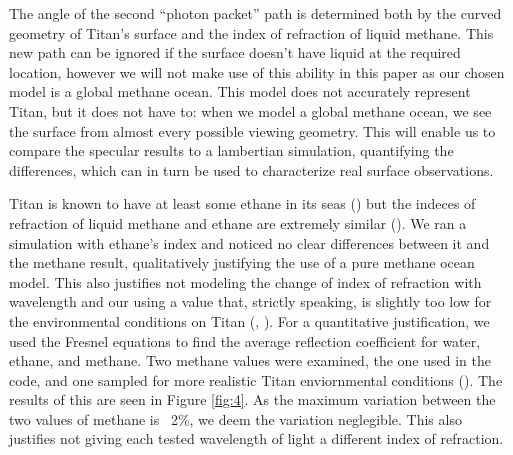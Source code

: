 \documentclass{article}
\begin{document}
The angle of the second ``photon packet'' path is determined both by the curved geometry of Titan's surface and the index of refraction of liquid methane. This new path can be ignored if the surface doesn't have liquid at the required location, however we will not make use of this ability in this paper as our chosen model is a global methane ocean. This model does not accurately represent Titan, but it does not have to: when we model a global methane ocean, we see the surface from almost every possible viewing geometry. This will enable us to compare the specular results to a lambertian simulation, quantifying the differences, which can in turn be used to characterize real surface observations. 

Titan is known to have at least some ethane in its seas (\cite{Mastrogiuseppe2016}) but the indeces of refraction of liquid methane and ethane are extremely similar (\cite{Kanjanasakul2020}). We ran a simulation with ethane's index and noticed no clear differences between it and the methane result, qualitatively justifying the use of a pure methane ocean model. This also justifies not modeling the change of index of refraction with wavelength and our using a value that, strictly speaking, is slightly too low for the environmental conditions on Titan (\cite{Martonchik1994}, \cite{Jennings2019}). For a quantitative justification, we used the Fresnel equations to find the average reflection coefficient for water, ethane, and methane. Two methane values were examined, the one used in the code, and one sampled for more realistic Titan enviornmental conditions (\cite{Martonchik1994}). The results of this are seen in Figure \ref{fig:4}. As the maximum variation between the two values of methane is ~2\%, we deem the variation neglegible. This also justifies not giving each tested wavelength of light a different index of refraction. 
\end{document}
